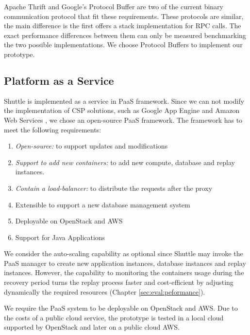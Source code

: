 Apache Thrift \cite{Thrift} and Google's Protocol Buffer \cite{protobuffers} are two of the current binary communication protocol that fit these requirements. These protocols are similar, the main difference is the first offers a stack implementation for \ac{RPC} calls. The exact performance differences between them can only be measured benchmarking the two possible implementations. We choose Protocol Buffers to implement our prototype.



\subsection{Platform as a Service}\label{sec:impl:paas}
Shuttle is implemented as a service in \ac{PaaS} framework. Since we can not modify the implementation of \ac{CSP} solutions, such as Google App Engine \cite{GoogleAppEngine} and Amazon Web Services \cite{AmazonElasticBeanstalk}, we chose an open-source \ac{PaaS} framework. The framework has to meet the following requirements: 

\begin{enumerate}
	\item \textit{Open-source:} to support updates and modifications
	\item \textit{Support to add new containers:} to add new compute, database and replay instances.
	\item \textit{Contain a load-balancer:} to distribute the requests after the proxy
	\item Extensible to support a new database management system
	\item Deployable on OpenStack and \ac{AWS}
	\item Support for Java Applications
\end{enumerate}

We consider the auto-scaling capability as optional since Shuttle may invoke the \ac{PaaS} manager to create new application instances, database instances and replay instances. However, the capability to monitoring the containers usage during the recovery period turns the replay process faster and cost-efficient by adjusting dynamically the required resources (Chapter \ref{sec:eval:peformance}). 

We require the \ac{PaaS} system to be deployable on OpenStack \cite{openstack} and \ac{AWS}. Due to the costs of a public cloud service, the prototype is tested in a local cloud supported by OpenStack and later on a public cloud \ac{AWS}.


